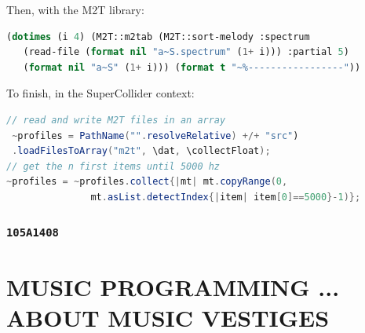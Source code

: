 \documentclass{book}
\begin{document}
Then, with the M2T library:

 \begin{lstlisting}[basicstyle=\footnotesize\ttfamily,language=Lisp]
(dotimes (i 4) (M2T::m2tab (M2T::sort-melody :spectrum 
   (read-file (format nil "a~S.spectrum" (1+ i))) :partial 5) 
   (format nil "a~S" (1+ i))) (format t "~%-----------------"))
\end{lstlisting}

To finish, in the SuperCollider context:

 \begin{lstlisting}[basicstyle=\footnotesize\ttfamily,language=Java]
// read and write M2T files in an array
 ~profiles = PathName("".resolveRelative) +/+ "src")
 .loadFilesToArray("m2t", \dat, \collectFloat); 
// get the n first items until 5000 hz
~profiles = ~profiles.collect{|mt| mt.copyRange(0, 
               mt.asList.detectIndex{|item| item[0]==5000}-1)};
 \end{lstlisting}
 
 \bigskip

\begin{mdframed}[style=stylesec]
\section{\texttt{105A1408}}
\label{105A1408}
\smallskip
\end{mdframed}


\bigskip

\backmatter

%




\part[Music Programming ... about music vestiges]{MUSIC PROGRAMMING ... ABOUT MUSIC VESTIGES}

\thispagestyle{empty}



%
%
%
%
\thispagestyle{empty}
\end{document}

